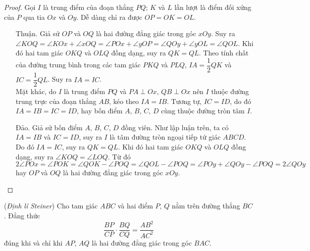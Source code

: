         \begin{proof}
            Gọi \(I\) là trung điểm của đoạn thẳng \(PQ\); \(K\) và \(L\) lần lượt là điểm đối xứng của \(P\) qua tia \(Ox\) và \(Oy\). Dễ dàng chỉ ra được \(OP = OK = OL\).

            \begin{enumerate}[leftmargin=1.25cm]
                \item[Thuận.] Giả sử \(OP\) và \(OQ\) là hai đường đẳng giác trong góc \(xOy\). Suy ra \(\angle KOQ = \angle KOx + \angle xOQ = \angle POx + \angle yOP = \angle QOy + \angle yOL = \angle QOL\). Khi đó hai tam giác \(OKQ\) và \(OLQ\) đồng dạng, suy ra \(QK = QL\). Theo tính chất của đường trung bình trong các tam giác \(PKQ\) và \(PLQ\), \(IA = \dfrac{1}{2}QK\) và \(IC = \dfrac{1}{2}QL\). Suy ra \(IA = IC\).\\
                Mặt khác, do \(I\) là trung điểm \(PQ\) và \(PA \perp Ox\), \(QB \perp Ox\) nên \(I\) thuộc đường trung trực của đoạn thẳng \(AB\), kéo theo \(IA = IB\). Tương tự, \(IC = ID\), do đó \(IA = IB = IC = ID\), hay bốn điểm \(A\), \(B\), \(C\), \(D\) cùng thuộc đường tròn tâm \(I\).
                \item[Đảo.] Giả sử bốn điểm \(A\), \(B\), \(C\), \(D\) đồng viên. Như lập luận trên, ta có \(IA = IB\) và \(IC = ID\), suy ra \(I\) là tâm đường tròn ngoại tiếp tứ giác \(ABCD\). Do đó \(IA = IC\), suy ra \(QK = QL\). Khi đó hai tam giác \(OKQ\) và \(OLQ\) đồng dạng, suy ra \(\angle KOQ = \angle LOQ\). Từ đó
                \[2 \angle POx = \angle POK = \angle QOK - \angle POQ = \angle QOL - \angle POQ = \angle POy + \angle QOy - \angle POQ = 2 \angle QOy\]
                hay \(OP\) và \(OQ\) là hai đường đẳng giác trong góc \(xOy\).
            \end{enumerate}
            
        \end{proof}

        \begin{theorem}
            (\textit{Định lí Steiner}) Cho tam giác \(ABC\) và hai điểm \(P\), \(Q\) nằm trên đường thẳng \(BC\). Đẳng thức
            \[\frac{BP}{CP} \cdot \frac{BQ}{CQ} = \frac{AB^2}{AC^2}\]
            đúng khi và chỉ khi \(AP\), \(AQ\) là hai đường đẳng giác trong góc \(BAC\).
        \end{theorem}


